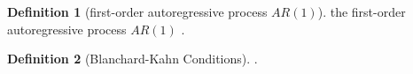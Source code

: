 \documentclass[
	12pt, 
	]{article}
\numberwithin{equation}{section}
\theoremstyle{definition}
\newtheorem{definition}{Definition}[section]
\theoremstyle{plain}
\theoremstyle{plain}
\theoremstyle{plain}
\begin{document}
\begin{definition}[first-order autoregressive process $AR(1)$]
	the first-order autoregressive process $AR(1)$ \cite[Lecture 5, p.4]{solis-garcia_ucb_2022}.
\end{definition}

\begin{definition}[Blanchard-Kahn Conditions]
	\cite[Hands on 5, p.14]{solis-garcia_ucb_2022}.
\end{definition}














\end{document}
